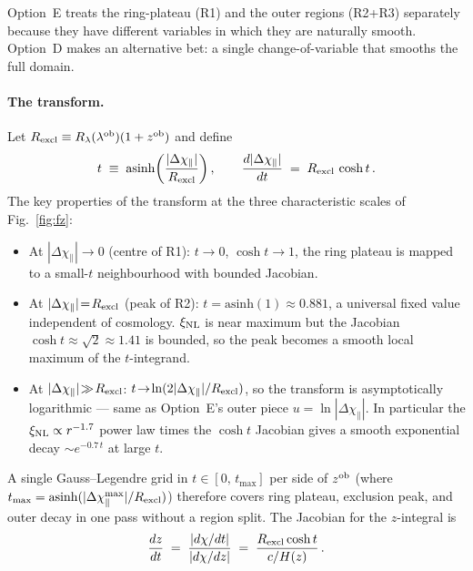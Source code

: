 \documentclass[11pt]{article}
\newcommand{\lob}{\lambda^{\rm ob}}
\newcommand{\zob}{z^{\rm ob}}
\newcommand{\xinl}{\xi_{\rm NL}}
\begin{document}
Option~E treats the ring-plateau (R1) and the outer regions (R2+R3)
separately because they have different variables in which they are
naturally smooth. Option~D makes an alternative bet: a single
change-of-variable that smooths the full domain.

\paragraph{The transform.}
Let \(R_{\rm excl}\equiv R_\lambda(\lob)(1+\zob)\) and define
\begin{equation}
t \;\equiv\; \mathrm{asinh}\!\left(\frac{|\Delta\chi_\parallel|}{R_{\rm excl}}\right),
\qquad
\frac{d|\Delta\chi_\parallel|}{dt} \;=\; R_{\rm excl}\,\cosh t \,.
\label{eq:asinh_transform}
\end{equation}
The key properties of the transform at the three characteristic
scales of Fig.~\ref{fig:fz}:
\begin{itemize}
  \item At \(|\Delta\chi_\parallel|\!\to\!0\) (centre of R1):
        \(t\!\to\!0\), \(\cosh t\!\to\!1\), the ring plateau is
        mapped to a small-\(t\) neighbourhood with bounded
        Jacobian.
  \item At \(|\Delta\chi_\parallel|\!=\!R_{\rm excl}\) (peak of R2):
        \(t\!=\!\mathrm{asinh}(1)\!\approx\!0.881\), a universal
        fixed value independent of cosmology. \(\xinl\) is near
        maximum but the Jacobian
        \(\cosh t\!\approx\!\sqrt 2\!\approx\!1.41\) is bounded, so
        the peak becomes a smooth local maximum of the
        \(t\)-integrand.
  \item At \(|\Delta\chi_\parallel|\!\gg\!R_{\rm excl}\):
        \(t\!\to\!\ln(2|\Delta\chi_\parallel|/R_{\rm excl})\), so
        the transform is asymptotically logarithmic --- same as
        Option~E's outer piece \(u=\ln|\Delta\chi_\parallel|\). In
        particular the \(\xinl\propto r^{-1.7}\) power law times
        the \(\cosh t\) Jacobian gives a smooth exponential decay
        \(\sim\!e^{-0.7\,t}\) at large \(t\).
\end{itemize}
A single Gauss--Legendre grid in \(t\in[0,\,t_{\max}]\) per side
of \(\zob\) (where
\(t_{\max}=\mathrm{asinh}(|\Delta\chi_\parallel^{\max}|/R_{\rm excl})\))
therefore covers ring plateau, exclusion peak, and outer decay in
one pass without a region split. The Jacobian for the \(z\)-integral
is
\begin{equation}
\frac{dz}{dt}
\;=\;\frac{|d\chi/dt|}{|d\chi/dz|}
\;=\;\frac{R_{\rm excl}\cosh t}{c/H(z)}\,.
\end{equation}
\end{document}
